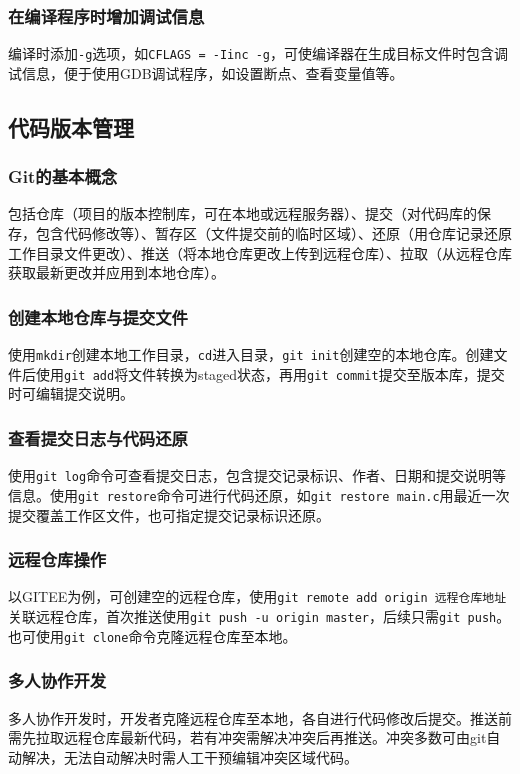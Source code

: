 \subsubsection{在编译程序时增加调试信息}
编译时添加\texttt{-g}选项，如\texttt{CFLAGS = -Iinc -g}，可使编译器在生成目标文件时包含调试信息，便于使用GDB调试程序，如设置断点、查看变量值等。


\subsection{代码版本管理}

\subsubsection{Git的基本概念}
包括仓库（项目的版本控制库，可在本地或远程服务器）、提交（对代码库的保存，包含代码修改等）、暂存区（文件提交前的临时区域）、还原（用仓库记录还原工作目录文件更改）、推送（将本地仓库更改上传到远程仓库）、拉取（从远程仓库获取最新更改并应用到本地仓库）。

\subsubsection{创建本地仓库与提交文件}
使用\texttt{mkdir}创建本地工作目录，\texttt{cd}进入目录，\texttt{git init}创建空的本地仓库。创建文件后使用\texttt{git add}将文件转换为staged状态，再用\texttt{git commit}提交至版本库，提交时可编辑提交说明。

\subsubsection{查看提交日志与代码还原}
使用\texttt{git log}命令可查看提交日志，包含提交记录标识、作者、日期和提交说明等信息。使用\texttt{git restore}命令可进行代码还原，如\texttt{git restore main.c}用最近一次提交覆盖工作区文件，也可指定提交记录标识还原。

\subsubsection{远程仓库操作}
以GITEE为例，可创建空的远程仓库，使用\texttt{git remote add origin 远程仓库地址}关联远程仓库，首次推送使用\texttt{git push -u origin master}，后续只需\texttt{git push}。也可使用\texttt{git clone}命令克隆远程仓库至本地。

\subsubsection{多人协作开发}
多人协作开发时，开发者克隆远程仓库至本地，各自进行代码修改后提交。推送前需先拉取远程仓库最新代码，若有冲突需解决冲突后再推送。冲突多数可由git自动解决，无法自动解决时需人工干预编辑冲突区域代码。
